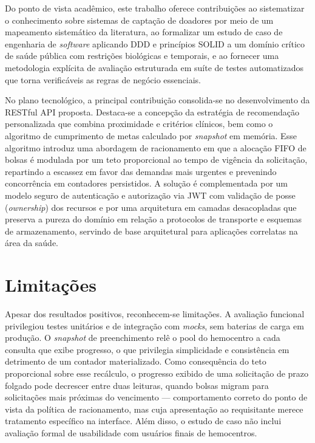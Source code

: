Do ponto de vista acadêmico, este trabalho oferece contribuições ao sistematizar o conhecimento sobre sistemas de captação de doadores por meio de um mapeamento sistemático da literatura, ao formalizar um estudo de caso de engenharia de \textit{software} aplicando DDD e princípios SOLID a um domínio crítico de saúde pública com restrições biológicas e temporais, e ao fornecer uma metodologia explícita de avaliação estruturada em suíte de testes automatizados que torna verificáveis as regras de negócio essenciais.

No plano tecnológico, a principal contribuição consolida-se no desenvolvimento da RESTful API proposta. Destaca-se a concepção da estratégia de recomendação personalizada que combina proximidade e critérios clínicos, bem como o algoritmo de cumprimento de metas calculado por \textit{snapshot} em memória. Esse algoritmo introduz uma abordagem de racionamento em que a alocação FIFO de bolsas é modulada por um teto proporcional ao tempo de vigência da solicitação, repartindo a escassez em favor das demandas mais urgentes e prevenindo concorrência em contadores persistidos. A solução é complementada por um modelo seguro de autenticação e autorização via JWT com validação de posse (\textit{ownership}) dos recursos e por uma arquitetura em camadas desacopladas que preserva a pureza do domínio em relação a protocolos de transporte e esquemas de armazenamento, servindo de base arquitetural para aplicações correlatas na área da saúde.

\section{Limitações}

Apesar dos resultados positivos, reconhecem-se limitações. A avaliação funcional privilegiou testes unitários e de integração com \textit{mocks}, sem baterias de carga em produção. O \textit{snapshot} de preenchimento relê o pool do hemocentro a cada consulta que exibe progresso, o que privilegia simplicidade e consistência em detrimento de um contador materializado. Como consequência do teto proporcional sobre esse recálculo, o progresso exibido de uma solicitação de prazo folgado pode decrescer entre duas leituras, quando bolsas migram para solicitações mais próximas do vencimento --- comportamento correto do ponto de vista da política de racionamento, mas cuja apresentação ao requisitante merece tratamento específico na interface. Além disso, o estudo de caso não inclui avaliação formal de usabilidade com usuários finais de hemocentros.

